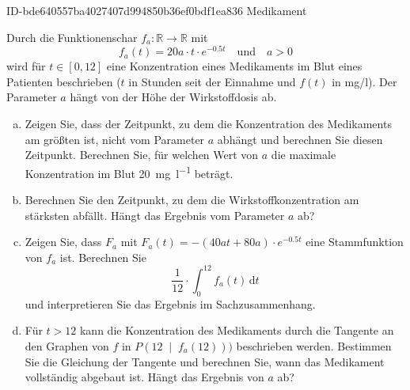 \begin{exercise}
      {ID-bde640557ba4027407d994850b36ef0bdf1ea836}
      {Medikament}
  \ifproblem\problem\par
    Durch die Funktionenschar $f_a:\mathbb{R}\to\mathbb{R}$ mit
    \begin{equation*}
      f_a(t)=20a\cdot t\cdot e^{\num{-0.5}t}
      \quad\text{und}\quad
      a>0
    \end{equation*}
    wird für $t\in[\num{0},\num{12}]$ eine Konzentration
    eines Medikaments im Blut eines Patienten beschrieben
    ($t$ in Stunden seit der Einnahme und $f(t)$ in
    \si[per-mode=symbol]{\milli\gram\per\litre}).
    Der Parameter $a$ hängt von der Höhe der
    Wirkstoffdosis ab.
    \begin{enumerate}[a)]
      \item Zeigen Sie, dass der Zeitpunkt, zu dem
            die Konzentration des Medikaments am
            größten ist, nicht vom Parameter $a$
            abhängt und berechnen Sie diesen
            Zeitpunkt.
            Berechnen Sie, für welchen Wert von
            $a$ die maximale Konzentration im Blut
            \SI[per-mode=symbol]{20}{\milli\gram\per\litre}
            beträgt.
      \item Berechnen Sie den Zeitpunkt, zu dem die
            Wirkstoffkonzentration am stärksten abfällt.
            Hängt das Ergebnis vom Parameter $a$ ab?
      \item Zeigen Sie, dass $F_a$ mit
            $F_a(t)=-(40at+80a)\cdot e^{\num{-0.5}t}$
            eine Stammfunktion von $f_a$ ist.
            Berechnen Sie
            \begin{equation*}
              \frac{1}{12}\cdot\int_{0}^{12}f_a(t)\,\mathrm{d}t
            \end{equation*}
            und interpretieren Sie das Ergebnis im
            Sachzusammenhang.
      \item Für $t>12$ kann die Konzentration des
            Medikaments durch die Tangente an den
            Graphen von $f$ in $P\left(12\;\middle|\;f_a(12)\right))$
            beschrieben werden.
            Bestimmen Sie die Gleichung der Tangente und
            berechnen Sie, wann das Medikament vollständig
            abgebaut ist. Hängt das Ergebnis von $a$ ab?
    \end{enumerate}
  \fi
\end{exercise}
